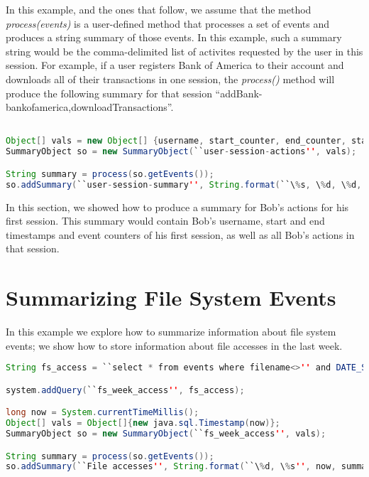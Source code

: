 In this example, and the ones that follow, we assume that the method \emph{process(events)} is a user-defined method that  processes a set of events and produces a string summary of those events. In this example, such a summary string would be the comma-delimited list of activites requested by the user in this session. For example, if a user registers Bank of America to their account and downloads all of their transactions in one session, the \emph{process()} method will produce the following summary for that session ``addBank-bankofamerica,downloadTransactions''.

\begin{lstlisting}[language=Java]

Object[] vals = new Object[] {username, start_counter, end_counter, start_time, end_time};
SummaryObject so = new SummaryObject(``user-session-actions'', vals);

String summary = process(so.getEvents());
so.addSummary(``user-session-summary'', String.format(``\%s, \%d, \%d, \%s, \%s'', username, start_counter, end_counter, start_time, end_time, summary));

\end{lstlisting}

\noindent
In this section, we showed how to produce a summary for Bob's actions for his first session. This summary would contain Bob's username, start and end timestamps and event counters of his first session, as well as all Bob's actions in that session.

\section{Summarizing File System Events}
\label{sum:fs}
In this example we explore how to summarize information about file system events; we show how to store information about file accesses in the last week.

\begin{lstlisting}[language=Java]
String fs_access = ``select * from events where filename<>'' and DATE_SUB(?, INTERVAL 7 DAY)'';

system.addQuery(``fs_week_access'', fs_access);

long now = System.currentTimeMillis();
Object[] vals = Object[]{new java.sql.Timestamp(now)};
SummaryObject so = new SummaryObject(``fs_week_access'', vals);

String summary = process(so.getEvents());
so.addSummary(``File accesses'', String.format(``\%d, \%s'', now, summary));
\end{lstlisting}

